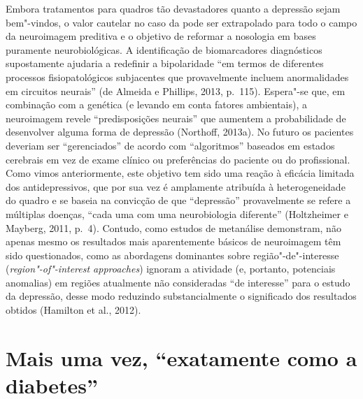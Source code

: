 Embora tratamentos para quadros tão devastadores quanto a depressão
sejam bem"-vindos, o valor cautelar no caso da  pode ser extrapolado
para todo o campo da neuroimagem preditiva e o objetivo de reformar a
nosologia em bases puramente neurobiológicas. A identificação de
biomarcadores diagnósticos supostamente ajudaria a redefinir a
bipolaridade ``em termos de diferentes processos fisiopatológicos
subjacentes que provavelmente incluem anormalidades em circuitos
neurais'' (de Almeida e Phillips, 2013, p.~115). Espera"-se que, em
combinação com a genética (e levando em conta fatores ambientais), a
neuroimagem revele ``predisposições neurais'' que aumentem a
probabilidade de desenvolver alguma forma de depressão (Northoff,
2013a). No futuro os pacientes deveriam ser ``gerenciados'' de acordo
com ``algoritmos'' baseados em estados cerebrais em vez de exame clínico
ou preferências do paciente ou do profissional. Como vimos
anteriormente, este objetivo tem sido uma reação à eficácia limitada dos
antidepressivos, que por sua vez é amplamente atribuída à
heterogeneidade do quadro e se baseia na convicção de que ``depressão''
provavelmente se refere a múltiplas doenças, ``cada uma com uma
neurobiologia diferente'' (Holtzheimer e Mayberg, 2011, p.~4). Contudo,
como estudos de metanálise demonstram, não apenas mesmo os resultados
mais aparentemente básicos de neuroimagem têm sido questionados, como as
abordagens dominantes sobre região"-de"-interesse
(\emph{region"-of"-interest approaches}) ignoram a atividade (e, portanto,
potenciais anomalias) em regiões atualmente não consideradas ``de
interesse'' para o estudo da depressão, desse modo reduzindo
substancialmente o significado dos resultados obtidos (Hamilton et al.,
2012).

\section{Mais uma vez, ``exatamente como a diabetes''}

